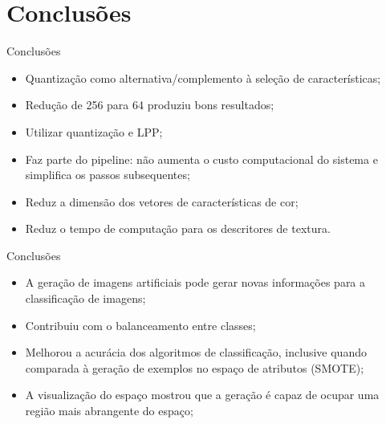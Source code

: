 \documentclass{beamer}
\begin{document}
\section{Conclusões}
\begin{frame}{Conclusões}
  \begin{itemize}
    \item Quantização como alternativa/complemento à seleção de características;
    \item Redução de 256 para 64 produziu bons resultados;
    \item Utilizar quantização e LPP;
    \item Faz parte do pipeline: não aumenta o custo computacional do sistema e simplifica os passos subsequentes;
    \item Reduz a dimensão dos vetores de características de cor;
    \item Reduz o tempo de computação para os descritores de textura.
  \end{itemize}
\end{frame}
\begin{frame}{Conclusões}
  \begin{itemize}
    \item A geração de imagens artificiais pode gerar novas informações para a classificação de imagens;
    \item Contribuiu com o balanceamento entre classes;
    \item Melhorou a acurácia dos algoritmos de classificação, inclusive quando comparada à geração de exemplos no espaço de atributos (SMOTE);
    \item A visualização do espaço mostrou que a geração é capaz de ocupar uma região mais abrangente do espaço;
  \end{itemize}
\end{frame}
\end{document}
